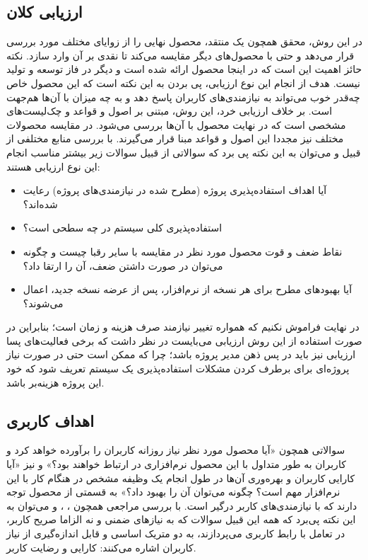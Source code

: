 \subsection{ارزیابی کلان}
در این روش، محقق همچون یک منتقد، محصول نهایی را از زوایای مختلف مورد بررسی قرار می‌دهد و حتی با محصول‌های دیگر مقایسه می‌کند تا نقدی بر آن وارد سازد. نکته حائز اهمیت این است که در اینجا محصول ارائه شده است و دیگر در فاز توسعه و تولید نیست. هدف از انجام این نوع ارزیابی، پی بردن به این نکته است که این محصول خاص چه‌قدر خوب می‌تواند به نیازمندی‌های کاربران پاسخ دهد و به چه میزان با آن‌ها هم‌جهت است. بر خلاف ارزیابی خرد، این روش، مبتنی بر اصول و قواعد و چک‌لیست‌های مشخصی است که در نهایت محصول با آن‌ها بررسی می‌شود. در مقایسه محصولات مختلف نیز مجددا این اصول و قواعد مبنا قرار می‌گیرند. با بررسی منابع مختلفی از قبیل
\cite{sommerville_software_2016} و
\cite{pressman_software_2015}
می‌توان به این نکته پی برد که سوالاتی از قبیل سوالات زیر بیشتر مناسب انجام این نوع ارزیابی هستند:
\begin{itemize}
	\item 
	آیا اهداف استفاده‌پذیری پروژه (مطرح شده در نیازمندی‌های پروژه) رعایت شده‌اند؟
	\item 
	استفاده‌پذیری کلی سیستم در چه سطحی است؟
	\item 
	نقاط ضعف و قوت محصول مورد نظر در مقایسه با سایر رقبا چیست و چگونه می‌توان در صورت داشتن ضعف، آن را ارتقا داد؟
	\item 
	آیا بهبودهای مطرح برای هر نسخه از نرم‌افزار، پس از عرضه نسخه جدید، اعمال می‌شوند؟
\end{itemize}
در نهایت فراموش نکنیم که همواره تغییر نیازمند صرف هزینه و زمان است؛‌ بنابراین در صورت استفاده از این روش ارزیابی می‌بایست در نظر داشت که برخی فعالیت‌های پسا ارزیابی نیز باید در پس ذهن مدیر پروژه باشد؛ چرا که ممکن است حتی در صورت نیاز پروژه‌ای برای برطرف کردن مشکلات استفاده‌پذیری یک سیستم تعریف شود که خود این پروژه هزینه‌بر باشد.
\subsection{اهداف کاربری}
سوالاتی همچون «آیا محصول مورد نظر نیاز روزانه کاربران را برآورده خواهد کرد و کاربران به طور متداول با این محصول نرم‌افزاری در ارتباط خواهند بود؟» و نیز «آیا کارایی کاربران و بهره‌وری آن‌ها در طول انجام یک وظیفه مشخص در هنگام کار با این نرم‌افزار مهم است؟ چگونه می‌توان آن را بهبود داد؟» به قسمتی از محصول توجه دارند که با نیازمندی‌های کاربر درگیر است. با بررسی‌ مراجعی همچون
\cite{albert_measuring_2013}،
\cite{noauthor_measuringu:_2018}،
\cite{hewett_role_1986} و
\cite{abran_usability_2003}
می‌توان به این نکته پی‌برد که همه این قبیل سوالات که به نیازهای ضمنی و نه الزاما صریح کاربر، در تعامل با رابط کاربری می‌پردازند، به دو متریک اساسی و قابل اندازه‌گیری از نیاز کاربران اشاره می‌کنند: کارایی و رضایت کاربر.
